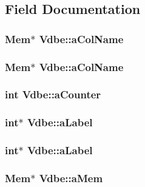 \subsection{Field Documentation}
\subsubsection{\setlength{\rightskip}{0pt plus 5cm}\bf{Mem}$\ast$ \bf{Vdbe::a\-Col\-Name}}\label{structVdbe_26a20240f7272738a7c335210b91ef58}


\subsubsection{\setlength{\rightskip}{0pt plus 5cm}\bf{Mem}$\ast$ \bf{Vdbe::a\-Col\-Name}}\label{structVdbe_26a20240f7272738a7c335210b91ef58}


\subsubsection{\setlength{\rightskip}{0pt plus 5cm}int \bf{Vdbe::a\-Counter}}\label{structVdbe_8ca37ec68c561afcdca389c5287a6747}


\subsubsection{\setlength{\rightskip}{0pt plus 5cm}int$\ast$ \bf{Vdbe::a\-Label}}\label{structVdbe_0f1daadddfb9a15bef80aba42c45033d}


\subsubsection{\setlength{\rightskip}{0pt plus 5cm}int$\ast$ \bf{Vdbe::a\-Label}}\label{structVdbe_0f1daadddfb9a15bef80aba42c45033d}


\subsubsection{\setlength{\rightskip}{0pt plus 5cm}\bf{Mem}$\ast$ \bf{Vdbe::a\-Mem}}\label{structVdbe_f2c55e397fd5e07b8c65b32eebeccaba}


